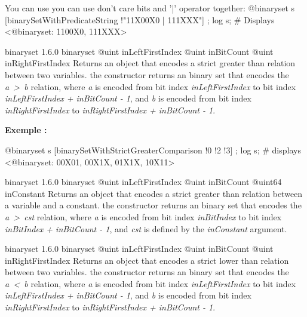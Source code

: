 \begin{galgascode}
You can use you can use don't care bits and '|' operator together:
@binaryset s [binarySetWithPredicateString !"11X00X0 | 111XXX"] ;
log s; # Displays <@binaryset: 1100X0, 111XXX>
\end{galgascode}





{binaryset}
{1.6.0}
{binaryset}
{@uint inLeftFirstIndex}
{@uint inBitCount}
{@uint inRightFirstIndex}
{Returns an  object that encodes a strict greater than relation between two variables.}
{the constructor returns an binary set that encodes the \emph{a~>~b} relation, where \emph{a} is encoded from bit index \emph{inLeftFirstIndex} to bit index \emph{inLeftFirstIndex  + inBitCount - 1}, and \emph{b} is encoded from bit index \emph{inRightFirstIndex} to \emph{inRightFirstIndex + inBitCount - 1}.}

\textbf{Exemple :}
\begin{galgascode}
@binaryset s [binarySetWithStrictGreaterComparison !0 !2 !3] ;
log s; # displays <@binaryset: 00X01, 00X1X, 01X1X, 10X11>
\end{galgascode}





{binaryset}
{1.6.0}
{binaryset}
{@uint inLeftFirstIndex}
{@uint inBitCount}
{@uint64 inConstant}
{Returns an  object that encodes a strict greater than relation between a variable and a constant.}
{the constructor returns an binary set that encodes the \emph{a~>~cst} relation, where \emph {a} is encoded from bit index \emph{inBitIndex} to bit index \emph{inBitIndex  + inBitCount - 1}, and \emph{cst} is defined by the \emph{inConstant} argument.}





{binaryset}
{1.6.0}
{binaryset}
{@uint inLeftFirstIndex}
{@uint inBitCount}
{@uint inRightFirstIndex}
{Returns an  object that encodes a strict lower than relation between two variables.}
{the constructor returns an binary set that encodes the \emph{a~<~b} relation, where \emph{a} is encoded from bit index \emph{inLeftFirstIndex} to bit index \emph{inLeftFirstIndex  + inBitCount - 1}, and \emph{b} is encoded from bit index \emph{inRightFirstIndex} to \emph{inRightFirstIndex + inBitCount - 1}.}

